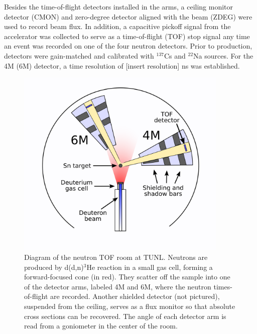 Besides the time-of-flight detectors installed in the arms, a ceiling monitor
detector (CMON) and zero-degree detector aligned with the beam (ZDEG) were used
to record beam flux. In addition, a capacitive pickoff signal
from the accelerator was collected to serve as a time-of-flight
(TOF) stop signal any time an event was recorded on one of the four neutron
detectors. Prior to production, detectors were gain-matched and calibrated with $^{137}$Cs
and $^{22}$Na sources. For the 4M (6M) detector, a time resolution of [insert
resolution] ns was established.

\begin{figure}[h]
    \centering
    \includegraphics[width = 0.9\textwidth]{figures/ExperimentalSetupTUNL.png}
    \caption[Diagram of the neutron TOF room at TUNL] 
    {
        Diagram of the neutron TOF room at TUNL. Neutrons are produced by d(d,n)$^{3}$He reaction in
        a small gas cell, forming a forward-focused cone (in red). They scatter
        off the sample into one of the detector arms, labeled 4M and 6M, where the neutron
        times-of-flight are recorded. Another shielded detector (not pictured), suspended from the 
        ceiling, serves as a flux monitor so that absolute cross sections can be
        recovered. The angle of each detector arm is read from a goniometer in
        the center of the room.
    }
    \label{ExperimentalSetupTUNL}
\end{figure}

